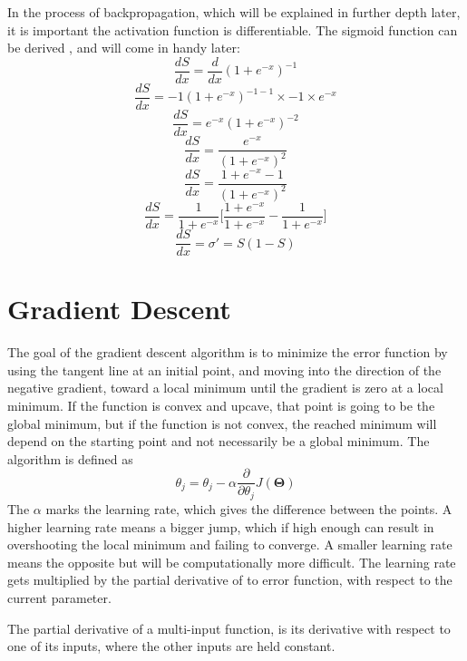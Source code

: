 \documentclass[a4paper,12pt]{article}
\begin{document}
In the process of backpropagation, which will be explained in further depth later, it is important the activation function is differentiable. The sigmoid function can be derived \cite{backpropagation}, and will come in handy later:
\[\frac{dS}{dx} = \frac{d}{dx}(1+e^{-x})^{-1}\]
\[\frac{dS}{dx} = -1(1+e^{-x})^{-1-1} \times -1 \times e^{-x}\]
\[\frac{dS}{dx} = e^{-x}(1+e^{-x})^{-2}\]
\[\frac{dS}{dx} = \frac{e^{-x}}{(1+e^{-x})^2}\]
\[\frac{dS}{dx} = \frac{1 + e^{-x} - 1}{(1+e^{-x})^2}\]
\[\frac{dS}{dx} = \frac{1}{1+e^{-x}}\bigg[\frac{1+e^{-x}}{1+e^{-x}} - \frac{1}{1+e^{-x}}\bigg] \]
\[\frac{dS}{dx} = \sigma' = S(1-S)\]

\section{Gradient Descent}
The goal of the gradient descent algorithm is to minimize the error function by using the tangent line at an initial point, and moving into the direction of the negative gradient, toward a local minimum until the gradient is zero at a local minimum. If the function is convex and upcave, that point is going to be the global minimum, but if the function is not convex, the reached minimum will depend on the starting point and not necessarily be a global minimum. The algorithm is defined as \cite{deeplearning} \[\theta_j = \theta_j - \alpha \frac{\partial}{\partial\theta_j} J(\boldsymbol{\Theta})\] The \(\alpha\) marks the learning rate, which gives the difference between the points. A higher learning rate means a bigger jump, which if high enough can result in overshooting the local minimum and failing to converge. A smaller learning rate means the opposite but will be computationally more difficult. The learning rate gets multiplied by the partial derivative of to error function, with respect to the current parameter. 

The partial derivative of a multi-input function, is its derivative with respect to one of its inputs, where the other inputs are held constant. 
\end{document}

